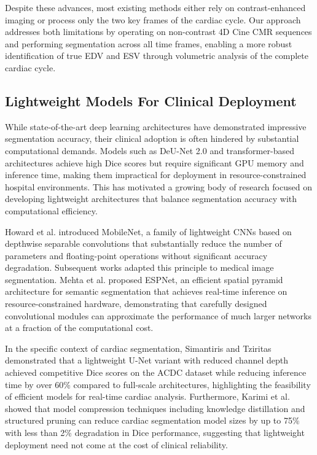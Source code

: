 \documentclass[final,3p,times,twocolumn]{elsarticle}
\begin{document}
Despite these advances, most existing methods either rely on contrast-enhanced imaging or process only the two key frames of the cardiac cycle. Our approach addresses both limitations by operating on non-contrast 4D Cine CMR sequences and performing segmentation across all time frames, enabling a more robust identification of true EDV and ESV through volumetric analysis of the complete cardiac cycle.

\subsection{Lightweight Models For Clinical Deployment}
While state-of-the-art deep learning architectures have demonstrated impressive segmentation accuracy, their clinical adoption is often hindered by substantial computational demands. Models such as DeU-Net 2.0 \cite{b10} and transformer-based architectures achieve high Dice scores but require significant GPU memory and inference time, making them impractical for deployment in resource-constrained hospital environments. This has motivated a growing body of research focused on developing lightweight architectures that balance segmentation accuracy with computational efficiency.

Howard et al. \cite{b22} introduced MobileNet, a family of lightweight CNNs based on depthwise separable convolutions that substantially reduce the number of parameters and floating-point operations without significant accuracy degradation. Subsequent works adapted this principle to medical image segmentation. Mehta et al. \cite{b23} proposed ESPNet, an efficient spatial pyramid architecture for semantic segmentation that achieves real-time inference on resource-constrained hardware, demonstrating that carefully designed convolutional modules can approximate the performance of much larger networks at a fraction of the computational cost.

In the specific context of cardiac segmentation, Simantiris and Tziritas \cite{b24} demonstrated that a lightweight U-Net variant with reduced channel depth achieved competitive Dice scores on the ACDC dataset while reducing inference time by over 60\% compared to full-scale architectures, highlighting the feasibility of efficient models for real-time cardiac analysis. Furthermore, Karimi et al. \cite{b25} showed that model compression techniques including knowledge distillation and structured pruning can reduce cardiac segmentation model sizes by up to 75\% with less than 2\% degradation in Dice performance, suggesting that lightweight deployment need not come at the cost of clinical reliability.
\end{document}
